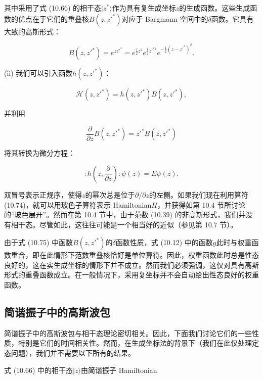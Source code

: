 其中采用了式 (10.66) 的相干态$|z^{*}\rangle$作为具有复生成坐标$z$的生成函数。这些生成函数的优点在于它们的重叠核$B(z,z'^{*})$对应于
Bargmann 空间中的$\delta$函数。它具有大致的高斯形式：

\begin{equation}
B(z,z'^{*})=e^{zz'^{*}}=e^{\frac{1}{2}z^{2}}e^{\frac{1}{2}z'^{*2}}e^{-\frac{1}{2}(z-z'^{*})^{2}}.\label{eq:10.80}
\end{equation}

(ii) 我们可以引入函数$h(z,z'^{*})$：

\begin{equation}
\mathscr{H}(z,z'^{*})=h(z,z'^{*})B(z,z'^{*}),\label{eq:10.81}
\end{equation}

并利用

\begin{equation}
\frac{\partial}{\partial z}B(z,z'^{*})=z'^{*}B(z,z'^{*})\label{eq:10.82}
\end{equation}

将其转换为微分方程：

\begin{equation}
:h\left(z,\frac{\partial}{\partial z}\right):\psi(z)=E\psi(z).\label{eq:10.83}
\end{equation}

双冒号表示正规序，使得$z$的幂次总是位于$\partial/\partial z$的左侧。如果我们现在利用算符 (10.74)，就可以用玻色子算符表示
Hamiltonian$H$，并获得如第 10.4 节所讨论的“玻色展开”。然而在第 10.4 节中，由于范数 (10.39) 的非高斯形式，我们并没有相干态。尽管如此，这往往可能是一个相当好的近似（参见第
10.7 节）。

由于式 (10.75) 中函数$B(z,z'^{*})$的$\delta$函数性质，式 (10.12) 中的函数$g$此时与权重函数重合，即在此情形下范数重叠核恰好是单位算符。因此，权重函数此时总是性态良好的，这在实生成坐标的情形下并不成立。然而我们必须强调，这仅对具有高斯形式的重叠函数成立。在一般情况下，采用复坐标并不会自动给出性态良好的权重函数。

\subsection{简谐振子中的高斯波包}

简谐振子中的高斯波包与相干态理论密切相关。因此，下面我们讨论它们的一些性质，特别是它们的时间相关性。然而，在生成坐标法的背景下（我们在此仅处理定态问题），我们并不需要以下所有的结果。

式 (10.66) 中的相干态$|z\rangle$由简谐振子 Hamiltonian

